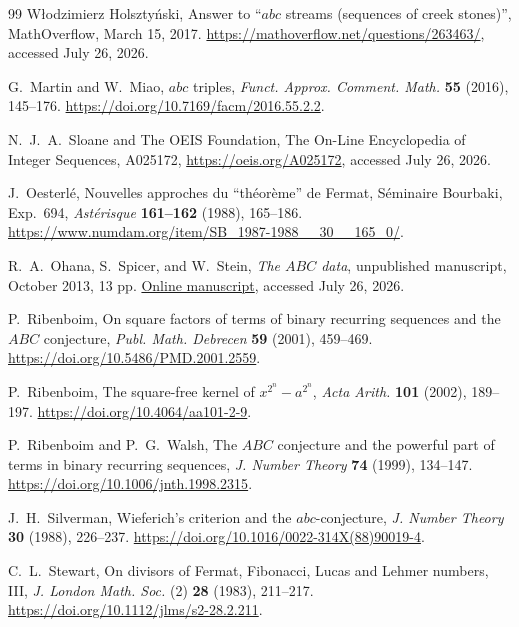 \documentclass[11pt]{article}
\theoremstyle{remark}
\begin{document}
\begin{thebibliography}{99}
W{\l}odzimierz Holszty\'nski,
\newblock Answer to ``\(abc\) streams (sequences of creek stones)'',
\newblock MathOverflow, March 15, 2017.
\newblock \url{https://mathoverflow.net/questions/263463/},
accessed July 26, 2026.

G.~Martin and W.~Miao,
\newblock \(abc\) triples,
\newblock \emph{Funct. Approx. Comment. Math.} \textbf{55} (2016),
145--176.
\newblock \url{https://doi.org/10.7169/facm/2016.55.2.2}.

N.~J.~A.~Sloane and The OEIS Foundation,
\newblock The On-Line Encyclopedia of Integer Sequences, A025172,
\newblock \url{https://oeis.org/A025172}, accessed July 26, 2026.

J.~Oesterl\'e,
\newblock Nouvelles approches du ``th\'eor\`eme'' de Fermat,
\newblock S\'eminaire Bourbaki, Exp.\ 694,
\emph{Ast\'erisque} \textbf{161--162} (1988), 165--186.
\newblock \url{https://www.numdam.org/item/SB_1987-1988__30__165_0/}.

R.~A.~Ohana, S.~Spicer, and W.~Stein,
\newblock \emph{The \(ABC\) data},
\newblock unpublished manuscript, October 2013, 13 pp.
\newblock
\href{https://cocalc.com/share/download/c1f4c5685b89bae0dfa24156574398b8c8172a3a/briefing/brief.pdf}
{Online manuscript}, accessed July 26, 2026.

P.~Ribenboim,
\newblock On square factors of terms of binary recurring sequences and
the \(ABC\) conjecture,
\newblock \emph{Publ. Math. Debrecen} \textbf{59} (2001), 459--469.
\newblock \url{https://doi.org/10.5486/PMD.2001.2559}.

P.~Ribenboim,
\newblock The square-free kernel of \(x^{2^n}-a^{2^n}\),
\newblock \emph{Acta Arith.} \textbf{101} (2002), 189--197.
\newblock \url{https://doi.org/10.4064/aa101-2-9}.

P.~Ribenboim and P.~G.~Walsh,
\newblock The \(ABC\) conjecture and the powerful part of terms in binary
recurring sequences,
\newblock \emph{J. Number Theory} \textbf{74} (1999), 134--147.
\newblock \url{https://doi.org/10.1006/jnth.1998.2315}.

J.~H.~Silverman,
\newblock Wieferich's criterion and the \(abc\)-conjecture,
\newblock \emph{J. Number Theory} \textbf{30} (1988), 226--237.
\newblock \url{https://doi.org/10.1016/0022-314X(88)90019-4}.

C.~L.~Stewart,
\newblock On divisors of Fermat, Fibonacci, Lucas and Lehmer numbers, III,
\newblock \emph{J. London Math. Soc.} (2) \textbf{28} (1983), 211--217.
\newblock \url{https://doi.org/10.1112/jlms/s2-28.2.211}.


\end{thebibliography}
\end{document}
